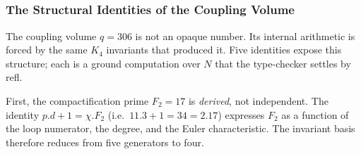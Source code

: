 \documentclass[11pt,a4paper]{book}
\def\cdot{.}%
\def\mathbb#1{#1}%
\def\texttt#1{#1}%
\begin{document}
\begin{code}
\AgdaSpace{}%
\AgdaSpace{}%
\<%
\\
%
\\[\AgdaEmptyExtraSkip]%
\>[0]\AgdaSpace{}%
\AgdaSymbol{:}\AgdaSpace{}%
\<%
\\
\>[0]\AgdaSpace{}%
\AgdaSymbol{=}\AgdaSpace{}%
\<%
\\
\>[0][@{}l@{\AgdaIndent{0}}]%
\>[2]\AgdaSymbol{\{}\AgdaSpace{}%
%
\>[22]\AgdaSymbol{=}\AgdaSpace{}%
\<%
\\
%
\>[2]\AgdaSymbol{;}\AgdaSpace{}%
%
\>[23]\AgdaSymbol{=}\AgdaSpace{}%
\<%
\\
%
\>[2]\AgdaSymbol{;}\AgdaSpace{}%
%
\>[23]\AgdaSymbol{=}\AgdaSpace{}%
\<%
\\
%
\>[2]\AgdaSymbol{;}\AgdaSpace{}%
%
\>[23]\AgdaSymbol{=}\AgdaSpace{}%
\<%
\\
%
\>[2]\AgdaSymbol{;}\AgdaSpace{}%
%
\>[23]\AgdaSymbol{=}\AgdaSpace{}%
\<%
\\
%
\>[2]\AgdaSymbol{\}}\<%
\end{code}

\subsubsection*{The Structural Identities of the Coupling Volume}

The coupling volume $q = 306$ is not an opaque number.  Its internal
arithmetic is forced by the same $K_4$ invariants that produced it.
Five identities expose this structure; each is a ground computation
over $\mathbb{N}$ that the type-checker settles by \texttt{refl}.

First, the compactification prime $F_2 = 17$ is \emph{derived}, not
independent.  The identity $p \cdot d + 1 = \chi \cdot F_2$ (i.e.\
$11 \cdot 3 + 1 = 34 = 2 \cdot 17$) expresses $F_2$ as a function of
the loop numerator, the degree, and the Euler characteristic.  The
invariant basis therefore reduces from five generators to four.
\end{document}
